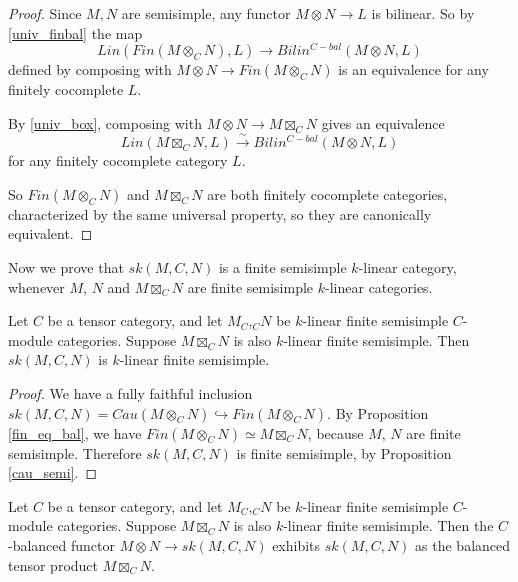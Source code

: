 \begin{proof} %

  \noindent Since $M,N$ are semisimple, any functor $M\otimes N\to L$ is
  bilinear. So by \ref{univ_finbal} the map \[Lin(Fin(M \otimes_{C} N), L) \to
  Bilin^{C-bal}(M \otimes N, L)\] defined by composing with $M\otimes N\to
  Fin(M\otimes_C N)$ is an equivalence for any finitely cocomplete $L$.

  By \ref{univ_box}, composing with $M\otimes N\to M\boxtimes_C N$ gives
  an equivalence \[Lin(M \boxtimes_{C} N, L) \xrightarrow{\sim}
  Bilin^{C-bal}(M \otimes N, L)\] for any finitely cocomplete category $L$.

  So $Fin(M\otimes_C N)$ and $M \boxtimes_{C} N$ are both finitely cocomplete
  categories, characterized by the same universal property, so they are
  canonically equivalent.
\end{proof}

Now we prove that $sk(M,C,N)$ is a finite semisimple $k$-linear category,
whenever $M$, $N$ and $M\boxtimes_C N$ are finite semisimple $k$-linear
categories.

\begin{lemma}\label{semisimple}
  Let $C$ be a tensor category, and let $M_C$,$_{C}N$ be $k$-linear finite
  semisimple $C$-module categories. Suppose $M\boxtimes_C N$ is also
  $k$-linear finite semisimple.
  Then $sk(M,C,N)$ is $k$-linear finite
  semisimple.
\end{lemma}

\begin{proof}
  We have a fully faithful inclusion $sk(M,C,N)=Cau(M\otimes_C
  N)\hookrightarrow Fin(M\otimes_C N)$. By Proposition \ref{fin_eq_bal}, we
  have $Fin(M\otimes_C N)\simeq M\boxtimes_C N$, because $M$, $N$ are finite
  semisimple. Therefore $sk(M,C,N)$ is finite semisimple, by
  Proposition \ref{cau_semi}.
\end{proof}

\begin{lemma}\label{sk_bal}
  Let $C$ be a tensor category, and let $M_C$,$_{C}N$ be $k$-linear finite
  semisimple $C$-module categories. Suppose $M\boxtimes_C N$ is also
  $k$-linear finite semisimple. Then the $C$-balanced functor $M\otimes N\to
  sk(M,C,N)$ exhibits $sk(M,C,N)$ as the balanced tensor product $M\boxtimes_C
  N$.
\end{lemma}

